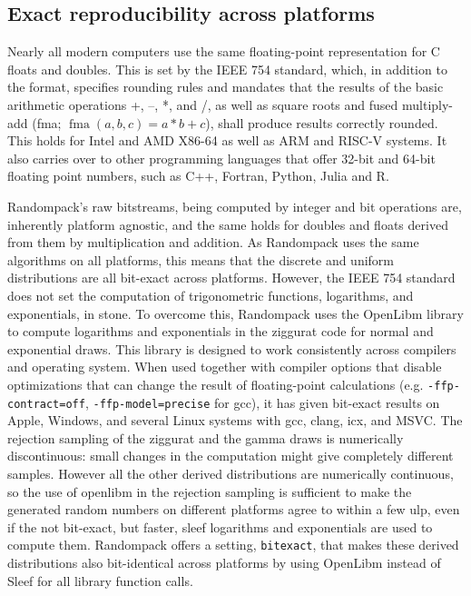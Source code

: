\documentclass[manuscript,screen,review]{acmart}
\begin{document}
\subsection{Exact reproducibility across platforms}
Nearly all modern computers use the same floating-point representation
for C floats and doubles. This is set by the IEEE 754 standard, which,
in addition to the format, specifies rounding rules and mandates that
the results of the basic arithmetic operations +, –, *, and /, as well
as square roots and fused multiply-add (fma;
$\operatorname{fma}(a,b,c)=a*b+c$), shall produce results correctly
rounded. This holds for Intel and AMD X86-64 as well as ARM and RISC-V
systems. It also carries over to other programming languages that
offer 32-bit and 64-bit floating point numbers, such as C++, Fortran,
Python, Julia and R.

Randompack's raw bitstreams, being computed by integer and bit
operations are, inherently platform agnostic, and the same holds for
doubles and floats derived from them by multiplication and addition.
As Randompack uses the same algorithms on all platforms, this means
that the discrete and uniform distributions are all bit-exact across
platforms. However, the IEEE 754 standard does not set the computation
of trigonometric functions, logarithms, and exponentials, in stone. To
overcome this, Randompack uses the OpenLibm library
\cite{openlibm,gladman2025accuracy} to compute logarithms and
exponentials in the ziggurat code for normal and exponential draws.
This library is designed to work consistently across compilers and
operating system. When used together with compiler options that
disable optimizations that can change the result of floating-point
calculations (e.g. \texttt{-ffp-contract=off},
\texttt{-ffp-model=precise} for gcc), it has given bit-exact results
on Apple, Windows, and several Linux systems with gcc, clang, icx, and
MSVC. The rejection sampling of the ziggurat and the gamma draws is
numerically discontinuous: small changes in the computation might give
completely different samples. However all the other derived
distributions are numerically continuous, so the use of openlibm in
the rejection sampling is sufficient to make the generated random
numbers on different platforms agree to within a few ulp, even if the
not bit-exact, but faster, sleef logarithms and exponentials are used
to compute them. Randompack offers a setting, \texttt{bitexact}, that
makes these derived distributions also bit-identical across platforms
by using OpenLibm instead of Sleef for all library function calls.
\end{document}
